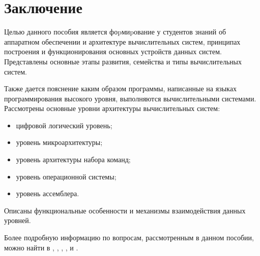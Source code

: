 \linespread{1.15}\selectfont

\chapter*{Заключение}

Целью данного пособия является фоpмиpование у студентов знаний об аппаратном обеспечении и архитектуре вычислительных систем, принципах построения и функционирования основных устройств данных систем. Представлены основные этапы развития, семейства и типы вычислительных систем.

Также дается пояснение каким образом программы, написанные на языках программирования высокого уровня, выполняются вычислительными системами. Рассмотрены основные уровни архитектуры вычислительных систем:
\begin{itemize}
	\item цифровой логический уровень;
	\item уровень микроархитектуры;
	\item уровень архитектуры набора команд;
	\item уровень операционной системы;
	\item уровень ассемблера.
\end{itemize}
Описаны функциональные особенности и механизмы взаимодействия данных уровней.

Более подробную информацию по вопросам, рассмотренным в данном пособии, можно найти в \cite{Gook}, \cite{Kalabekov}, \cite{Lehin}, \cite{Tanenbaum}, и \cite{Asmworld}.